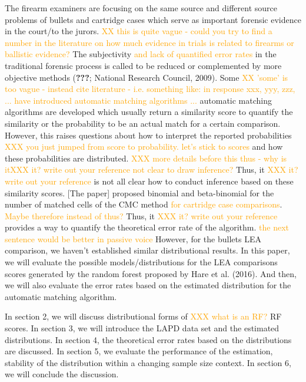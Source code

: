 \documentclass[]{elsarticle} %
\begin{document}
The firearm examiners are focusing on the same source and different
source problems of bullets and cartridge cases which serve as important
forensic evidence in the court/to the jurors.
{\textcolor{orange}{XX this is quite vague - could you try to find a number in the literature on how much evidence in trials is related to firearms or ballistic evidence?}}
The subjectivity
{\textcolor{orange}{and lack of quantified error rates}} in the
traditional forensic process is called to be reduced or complemented by
more objective methods ({\textbf{???}}; National Research Council,
2009). Some
{\textcolor{orange}{XX 'some' is too vague - instead cite literature - i.e. something like: in response xxx, yyy, zzz, ... have introduced automatic matching algorithms ...}}
automatic matching algorithms are developed which usually return a
similarity score to quantify the similarity or the probability to be an
actual match for a certain comparison. However, this raises questions
about how to interpret the reported probabilities
{\textcolor{orange}{XXX you just jumped from score to probability. let's stick to scores}}
and how these probabilities are distributed.
{\textcolor{orange}{XXX more details before this thus - why is it{\textcolor{orange}{XXX it? write out your reference}} not clear to draw inference?}}
Thus, it {\textcolor{orange}{XXX it? write out your reference}} is not
all clear how to conduct inference based on these similarity scores.
{[}The paper{]} proposed binomial and beta-binomial for the number of
matched cells of the CMC method
{\textcolor{orange}{for cartridge case comparisons}}.
{\textcolor{orange}{Maybe therefore instead of thus?}} Thus, it
{\textcolor{orange}{XXX it? write out your reference}} provides a way to
quantify the theoretical error rate of the algorithm.
{\textcolor{orange}{the next sentence would be better in passive voice}}
However, for the bullets LEA comparison, we haven't established similar
distributional results. In this paper, we will evaluate the possible
models/distributions for the LEA comparisons scores generated by the
random forest proposed by Hare et al. (2016). And then, we will also
evaluate the error rates based on the estimated distribution for the
automatic matching algorithm.

In section 2, we will discuss distributional forms of
{\textcolor{orange}{XXX what is an RF?}} RF scores. In section 3, we
will introduce the LAPD data set and the estimated distributions. In
section 4, the theoretical error rates based on the distributions are
discussed. In section 5, we evaluate the performance of the estimation,
stability of the distribution within a changing sample size context. In
section 6, we will conclude the discussion.
\end{document}

